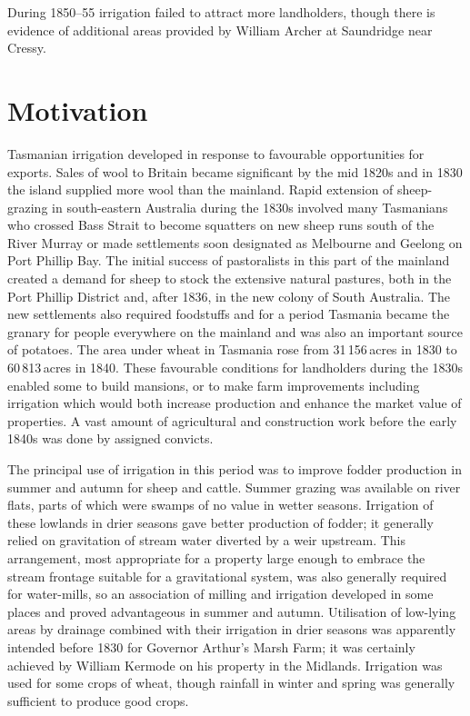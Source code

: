 During 1850--55 irrigation failed to attract more landholders, though
there is evidence of additional areas provided by William Archer at
Saundridge near Cressy.

\section*{Motivation}

Tasmanian irrigation developed in response to favourable opportunities
for exports.  Sales of wool to Britain
became significant by the mid 1820s and in 1830 the island supplied
more wool than the mainland.  Rapid extension of sheep-grazing in
south-eastern Australia during the 1830s involved many Tasmanians who
crossed Bass Strait to become squatters on new sheep runs
south of the River Murray or made settlements soon
designated as Melbourne and
Geelong  on Port Phillip Bay. The initial success of pastoralists in this part
of the mainland created a demand for sheep to stock the
extensive natural pastures, both in the Port Phillip District and,
after 1836, in the new colony of South Australia. The new settlements also required foodstuffs and for a
period Tasmania became the granary for people everywhere on the
mainland and was also an important source of potatoes.  The area under
wheat in Tasmania rose from 31\,156\,acres in 1830 to
60\,813\,acres in 1840.  These favourable conditions for landholders
during the 1830s enabled some to build mansions, or to make farm
improvements including irrigation which would both increase production
and enhance the market value of properties.  A vast amount of
agricultural and construction work before the early 1840s was done by
assigned convicts.

The principal use of irrigation in this period was to improve
fodder production in summer and autumn for
sheep and cattle. Summer grazing was available on river
flats, parts of which were swamps of no value in wetter seasons.
Irrigation of these lowlands in drier seasons gave better production
of fodder; it generally relied on gravitation of stream water diverted
by a weir upstream.  This arrangement, most appropriate for a property
large enough to embrace the stream frontage suitable for a
gravitational system, was also generally required for
water-mills, so an association of milling and
irrigation developed in some places and proved advantageous in summer
and autumn.  Utilisation of low-lying areas by
drainage combined with their irrigation in drier
seasons was apparently intended before 1830 for Governor Arthur's
Marsh Farm; it was certainly achieved by William Kermode on his
property in the Midlands.  Irrigation was used for some crops of
wheat, though rainfall in winter and spring was generally
sufficient to produce good crops.


